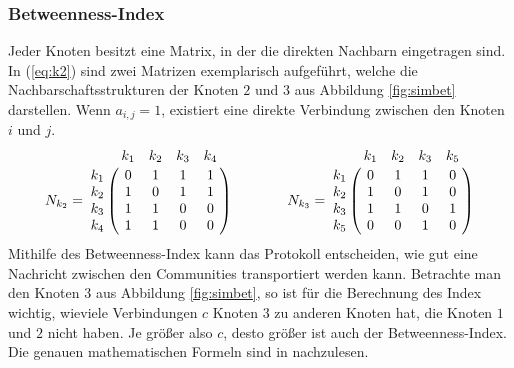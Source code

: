 \documentclass[a4paper, 12pt]{article}
\begin{document}
\subsubsection{Betweenness-Index}
Jeder Knoten besitzt eine Matrix, in der die direkten Nachbarn eingetragen sind. In (\ref{eq:k2}) sind zwei Matrizen exemplarisch aufgeführt, welche die Nachbarschaftsstrukturen der Knoten $2$ und $3$ aus Abbildung \ref{fig:simbet} darstellen. Wenn $a_{i,j} = 1$, existiert eine direkte Verbindung zwischen den Knoten $i$ und $j$.
\begin{equation}
	\label{eq:k2}
	N_{k_2} = \bordermatrix{~ 	& k_1	& k_2	& k_3	& k_4 \cr
                  		k_1 & 0 	& 1 	& 1 	& 1 \cr
                  		k_2 & 1 	& 0 	& 1 	& 1 \cr
                  		k_3 & 1 	& 1 	& 0 	& 0 \cr
                  		k_4 & 1 	& 1 	& 0 	& 0 \cr}
                  		\quad \quad \quad \quad
    N_{k_3} = \bordermatrix{~ 	& k_1	& k_2	& k_3	& k_5 \cr
                  		k_1 & 0 	& 1 	& 1 	& 0 \cr
                  		k_2 & 1 	& 0 	& 1 	& 0 \cr
                  		k_3 & 1 	& 1 	& 0 	& 1 \cr
                  		k_5 & 0 	& 0 	& 1 	& 0 \cr}
\end{equation}
Mithilfe des Betweenness-Index kann das Protokoll entscheiden, wie gut eine Nachricht zwischen den Communities transportiert werden kann. 
Betrachte man den Knoten $3$ aus Abbildung \ref{fig:simbet}, so ist für die Berechnung des Index wichtig, wieviele Verbindungen $c$ Knoten $3$ zu anderen Knoten hat, die Knoten $1$ und $2$ nicht haben. Je größer also $c$, desto größer ist auch der Betweenness-Index. 
\\
Die genauen mathematischen Formeln sind in \cite[p.~35f]{daly2007social} nachzulesen.
\end{document}
